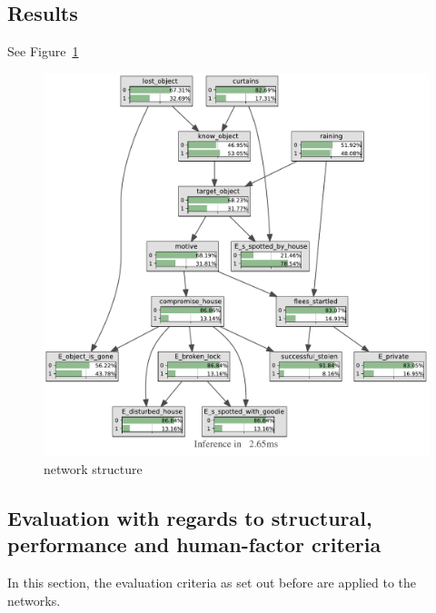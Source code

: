 \subsection{Results}

See Figure~\ref{laptop}

\begin{figure}[htbp]
\begin{center}
\includegraphics[width=\linewidth]{../experiments/StolenLaptop/bnImage/BNIMAGEStolenLaptop.pdf}
\end{center}
\caption{network structure}
\label{laptop}
\end{figure}


\subsection{Evaluation with regards to structural, performance and human-factor criteria}
In this section, the evaluation criteria as set out before are applied to the networks.

